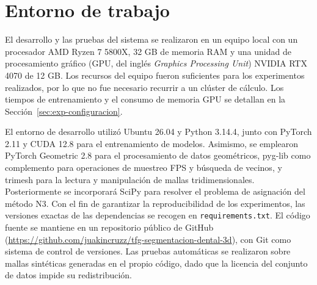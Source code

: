 \section{Entorno de trabajo}
\label{sec:entorno}

El desarrollo y las pruebas del sistema se realizaron en un equipo local con un procesador AMD Ryzen 7 5800X, 32 GB de memoria RAM y una unidad de procesamiento gráfico (GPU, del inglés \textit{Graphics Processing Unit}) NVIDIA RTX 4070 de 12 GB. Los recursos del equipo fueron suficientes para los experimentos realizados, por lo que no fue necesario recurrir a un clúster de cálculo. Los tiempos de entrenamiento y el consumo de memoria GPU se detallan en la Sección~\ref{sec:exp-configuracion}.

El entorno de desarrollo utilizó Ubuntu 26.04 y Python 3.14.4, junto con PyTorch 2.11 y CUDA 12.8 para el entrenamiento de modelos. Asimismo, se emplearon PyTorch Geometric 2.8 \cite{feyFastGraphRepresentation2019} para el procesamiento de datos geométricos, pyg-lib como complemento para operaciones de muestreo FPS y búsqueda de vecinos, y trimesh para la lectura y manipulación de mallas tridimensionales. Posteriormente se incorporará SciPy para resolver el problema de asignación del método N3. Con el fin de garantizar la reproducibilidad de los experimentos, las versiones exactas de las dependencias se recogen en \texttt{requirements.txt}. El código fuente se mantiene en un repositorio público de GitHub (\url{https://github.com/juakincruzz/tfg-segmentacion-dental-3d}), con Git como sistema de control de versiones. Las pruebas automáticas se realizaron sobre mallas sintéticas generadas en el propio código, dado que la licencia del conjunto de datos impide su redistribución.